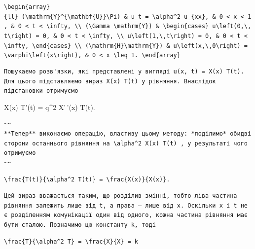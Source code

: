 \documentclass[
  ukrainian,
]{article}
\begin{document}
\texttt{\textbackslash{}begin\{array\}\{ll\}\ (\textbackslash{}mathrm\{Y\}\^{}\{\textbackslash{}mathbf\{U\}\}\textbackslash{}Pi)\ \&\ u\_t\ =\ \textbackslash{}alpha\^{}2\ u\_\{xx\},\ \&\ 0\ \textless{}\ x\ \textless{}\ 1,\ \&\ 0\ \textless{}\ t\ \textless{}\ \textbackslash{}infty,\ \textbackslash{}\textbackslash{}\ (\textbackslash{}Gamma\ \textbackslash{}mathrm\{Y\})\ \&\ \textbackslash{}begin\{cases\}\ u\textbackslash{}left(0,\textbackslash{},t\textbackslash{}right)\ =\ 0,\ \&\ 0\ \textless{}\ t\ \textless{}\ \textbackslash{}infty,\ \textbackslash{}\textbackslash{}\ u\textbackslash{}left(1,\textbackslash{},t\textbackslash{}right)\ =\ 0,\ \&\ 0\ \textless{}\ t\ \textless{}\ \textbackslash{}infty,\ \textbackslash{}end\{cases\}\ \textbackslash{}\textbackslash{}\ (\textbackslash{}mathrm\{H\}\textbackslash{}mathrm\{Y\})\ \&\ u\textbackslash{}left(x,\textbackslash{},0\textbackslash{}right)\ =\ \textbackslash{}varphi\textbackslash{}left(x\textbackslash{}right),\ \&\ 0\ \textless{}\ x\ \textbackslash{}leq\ 1.\ \textbackslash{}end\{array\}}

\begin{verbatim}
Пошукаємо розв'язки, які представлені у вигляді u(x, t) = X(x) T(t). Для цього підставляємо вираз X(x) T(t) у рівняння. Внаслідок підстановки отримуємо
\end{verbatim}

X(x) T'(t) = q\^{}2 X'\,'(x) T(t).

\begin{verbatim}
~~
**Тепер** виконаємо операцію, властиву цьому методу: *поділимо* обидві сторони останнього рівняння на \alpha^2 X(x) T(t) , у результаті чого отримуємо
~~
\end{verbatim}

\texttt{\textbackslash{}frac\{T\textquotesingle{}(t)\}\{\textbackslash{}alpha\^{}2\ T(t)\}\ =\ \textbackslash{}frac\{X\textquotesingle{}\textquotesingle{}(x)\}\{X(x)\}.}

\begin{verbatim}
Цей вираз вважається таким, що розділив змінні, тобто ліва частина рівняння залежить лише від t, а права — лише від x. Оскільки x і t не є розділенням комунікації один від одного, кожна частина рівняння має бути сталою. Позначимо цю константу k, тоді
\end{verbatim}

\texttt{\textbackslash{}frac\{T\textquotesingle{}\}\{\textbackslash{}alpha\^{}2\ T\}\ =\ \textbackslash{}frac\{X\textquotesingle{}\textquotesingle{}\}\{X\}\ =\ k}
\end{document}
